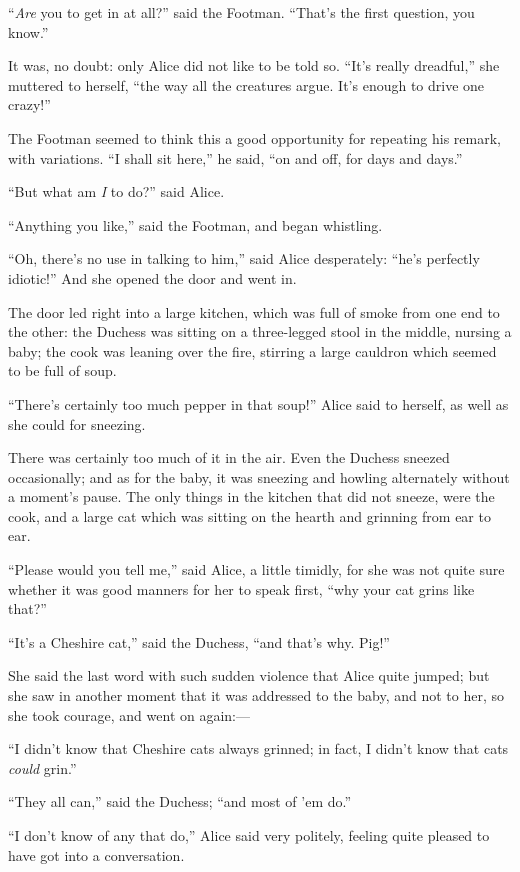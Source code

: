 \documentclass[book, 20pt]{extbook}
\begin{document}
``\emph{Are} you to get in at all?'' said the Footman. ``That's the
first question, you know.''

It was, no doubt: only Alice did not like to be told so. ``It's really
dreadful,'' she muttered to herself, ``the way all the creatures argue.
It's enough to drive one crazy!''

The Footman seemed to think this a good opportunity for repeating his
remark, with variations. ``I shall sit here,'' he said, ``on and off,
for days and days.''

``But what am \emph{I} to do?'' said Alice.

``Anything you like,'' said the Footman, and began whistling.

``Oh, there's no use in talking to him,'' said Alice desperately: ``he's
perfectly idiotic!'' And she opened the door and went in.

The door led right into a large kitchen, which was full of smoke from
one end to the other: the Duchess was sitting on a three-legged stool in
the middle, nursing a baby; the cook was leaning over the fire, stirring
a large cauldron which seemed to be full of soup.

``There's certainly too much pepper in that soup!'' Alice said to
herself, as well as she could for sneezing.

There was certainly too much of it in the air. Even the Duchess sneezed
occasionally; and as for the baby, it was sneezing and howling
alternately without a moment's pause. The only things in the kitchen
that did not sneeze, were the cook, and a large cat which was sitting on
the hearth and grinning from ear to ear.

``Please would you tell me,'' said Alice, a little timidly, for she was
not quite sure whether it was good manners for her to speak first, ``why
your cat grins like that?''

``It's a Cheshire cat,'' said the Duchess, ``and that's why. Pig!''

She said the last word with such sudden violence that Alice quite
jumped; but she saw in another moment that it was addressed to the baby,
and not to her, so she took courage, and went on again:---

``I didn't know that Cheshire cats always grinned; in fact, I didn't
know that cats \emph{could} grin.''

``They all can,'' said the Duchess; ``and most of 'em do.''

``I don't know of any that do,'' Alice said very politely, feeling quite
pleased to have got into a conversation.
\end{document}
